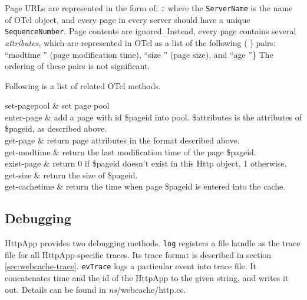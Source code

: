 Page URLs are represented in the form of:
{\tt {}:}
where the {\tt ServerName} is the name of OTcl object, and 
every page in every server should have a unique {\tt SequenceNumber}. 
Page contents are ignored. Instead, every page contains several 
\emph{attributes}, which are represented in OTcl as a list of the following 
( ) pairs: ``modtime '' (page 
modification time), ``size '' (page size), and ``age ''\}
The ordering of these pairs is not significant.

Following is a list of related OTcl methods.

\begin{\par\tabular{\textwidth}{rX}}
set-pagepool  & set page pool \\

enter-page   & add a page with id \$pageid
into pool. \$attributes is the attributes of \$pageid, as described above. \\

get-page  & return page attributes in the format described 
above. \\

get-modtime  & return the last modification time of the page 
\$pageid. \\

exist-page  & return 0 if \$pageid doesn't exist in this 
Http object, 1 otherwise. \\

get-size  & return the size of \$pageid. \\

get-cachetime  & return the time when page \$pageid is entered
into the cache. \\
\end{\par\tabular{\textwidth}{rX}}

\subsection{Debugging}
\label{sec:webcache-debug}

HttpApp provides two debugging methods. {\tt log} registers a file 
handle as the trace file for all HttpApp-specific traces. Its trace format 
is described in section \ref{sec:webcache-trace}. {\tt evTrace} logs a 
particular event into trace file. It concatenates
time and the id of the HttpApp to the given string, and writes it out. 
Details can be found in \emph{ns}/webcache/http.cc.



